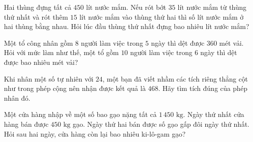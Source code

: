 \begin{ex} %
Hai thùng đựng tất cả $450\text{ lít}$ nước mắm. Nếu rót bớt $35\text{ lít}$ nước mắm từ thùng thứ nhất và rót thêm $15\text{ lít}$ nước mắm vào thùng thứ hai thì số lít nước mắm ở hai thùng bằng nhau. Hỏi lúc đầu thùng thứ nhất đựng bao nhiêu lít nước mắm?
\end{ex}

\begin{ex} %
Một tổ công nhân gồm $8$ người làm việc trong $5$ ngày thì dệt được $360$ mét vải. Hỏi với mức làm như thế, một tổ gồm $10$ người làm việc trong $6$ ngày thì dệt được bao nhiêu mét vải?
\end{ex}

\begin{ex} %
Khi nhân một số tự nhiên với $24$, một bạn đã viết nhầm các tích riêng thẳng cột như trong phép cộng nên nhận được kết quả là $468$. Hãy tìm tích đúng của phép nhân đó.
\end{ex}

\begin{ex} %
Một cửa hàng nhập về một số bao gạo nặng tất cả $1\,450\text{ kg}$. Ngày thứ nhất cửa hàng bán được $450\text{ kg}$ gạo. Ngày thứ hai bán được số gạo gấp đôi ngày thứ nhất. Hỏi sau hai ngày, cửa hàng còn lại bao nhiêu ki-lô-gam gạo?
\end{ex}
